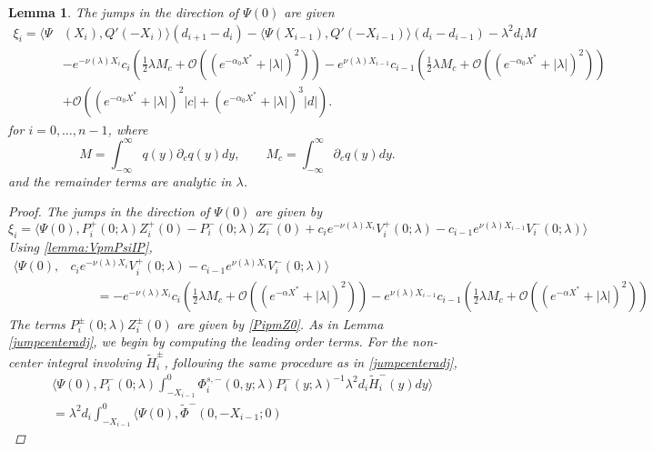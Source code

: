 \documentclass[10pt,reqno]{amsart}
\theoremstyle{plain}
\newtheorem{lemma}[theorem]{Lemma}
\theoremstyle{definition}
\theoremstyle{remark}
\numberwithin{theorem}{section}
\numberwithin{equation}{section}
\begin{document}
\begin{lemma}\label{jumpadj}
The jumps in the direction of $\Psi(0)$ are given 
\begin{equation}\label{jumpPsi0}
\begin{aligned}
\xi_i = \langle \Psi&(X_i), Q'(-X_i) \rangle (d_{i+1} - d_i ) - \langle \Psi(X_{i-1}), Q'(-X_{i-1}) \rangle (d_i - d_{i-1} ) - \lambda^2 d_i M  \\
&-e^{-\nu(\lambda)X_i}c_i \left( \frac{1}{2}\lambda M_c + \mathcal{O}\left( (e^{-\alpha_0 X^*} +|\lambda|)^2 \right)\right) - e^{\nu(\lambda)X_{i-1}}c_{i-1}\left( \frac{1}{2}\lambda M_c + \mathcal{O}\left( (e^{-\alpha_0 X^*} +|\lambda|)^2 \right)\right) \\
&+ \mathcal{O}\left( (e^{-\alpha_0 X^*} + |\lambda|)^2 |c| + (e^{-\alpha_0 X^*} + |\lambda|)^3 |d| \right).
\end{aligned}
\end{equation}
for $i = 0, \dots, n-1$, where
\[
M = \int_{-\infty}^\infty q(y) \partial_c q(y) dy, \qquad
M_c = \int_{-\infty}^\infty \partial_c q(y) dy.
\]
and the remainder terms are analytic in $\lambda$.
\begin{proof}
The jumps in the direction of $\Psi(0)$ are given by
\[
\xi_i = 
\langle \Psi(0), P_i^+(0; \lambda) Z_i^+(0) - P_i^-(0; \lambda) Z_i^-(0) + c_i e^{-\nu(\lambda)X_i}V_i^+(0; \lambda) - c_{i-1} e^{\nu(\lambda)X_{i-1}} V_i^-(0; \lambda) \rangle 
\]
Using \cref{lemma:VpmPsiIP},
\begin{align*}
\langle \Psi(0), &c_i e^{-\nu(\lambda)X_i}V_i^+(0; \lambda) - c_{i-1} e^{\nu(\lambda)X_i} V_i^-(0; \lambda) \rangle \\
&\qquad = -e^{-\nu(\lambda)X_i}c_i \left( \frac{1}{2}\lambda M_c + \mathcal{O}\left( (e^{-\alpha X^*} +|\lambda|)^2 \right)\right) - e^{\nu(\lambda)X_{i-1}}c_{i-1}\left( \frac{1}{2}\lambda M_c + \mathcal{O}\left( (e^{-\alpha X^*} +|\lambda|)^2 \right)\right) 
\end{align*}
The terms $P_i^\pm(0; \lambda) Z_i^\pm(0)$ are given by \cref{PipmZ0}. As in Lemma \ref{jumpcenteradj}, we begin by computing the leading order terms. For the non-center integral involving $\tilde{H}_i^\pm$, following the same procedure as in \cref{jumpcenteradj},
\begin{align*}
&\langle \Psi(0), P_i^-(0; \lambda) \int_{-X_{i-1}}^0 \Phi_i^{s,-}(0, y; \lambda) P_i^-(y; \lambda)^{-1} \lambda^2 d_i \tilde{H}_i^-(y) dy \rangle \\
&= \lambda^2 d_i \int_{-X_{i-1}}^0 \langle \Psi(0), \tilde{\Phi}^-(0, -X_{i-1}; 0) 

\end{align*}
\end{proof}
\end{lemma}
\end{document}
